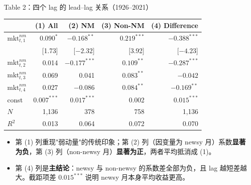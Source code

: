 \documentclass[aspectratio=169,10pt]{beamer}
\newcommand{\tighttable}{\scriptsize\setlength{\tabcolsep}{3pt}\renewcommand{\arraystretch}{1.12}}
\begin{document}
\begin{frame}{Table 2：四个 lag 的 lead--lag 关系（1926--2021）}
	\tighttable
	\begin{tabular}{lrrrr}
		\toprule
		& (1) All & (2) NM & (3) Non-NM & (4) Difference \\
		\midrule
		$\mathrm{mkt}^{nm}_{t,1}$ & $0.090^{*}$ & $-0.168^{**}$ & $0.219^{***}$ & $-0.388^{***}$ \\
		& [1.73] & [$-2.32$] & [3.92] & [$-4.23$] \\
		$\mathrm{mkt}^{nm}_{t,2}$ & 0.014 & $-0.177^{***}$ & $0.109^{**}$ & $-0.287^{***}$ \\
		$\mathrm{mkt}^{nm}_{t,3}$ & 0.069 & 0.041 & $0.083^{**}$ & $-0.042$ \\
		$\mathrm{mkt}^{nm}_{t,4}$ & 0.027 & $-0.086$ & $0.084^{**}$ & $-0.169^{**}$ \\
		const & $0.007^{***}$ & $0.017^{***}$ & 0.002 & $0.015^{***}$ \\
		$N$ & 1{,}136 & 378 & 758 & 1{,}136 \\
		$R^2$ & 0.013 & 0.064 & 0.072 & 0.070 \\
		\bottomrule
	\end{tabular}
	\vspace{4pt}
	\begin{itemize}
		\item 第 (1) 列重现"弱动量"的传统印象；第 (2) 列（因变量为 newsy 月）系数\textbf{显著为负}，第 (3) 列（non-newsy 月）\textbf{显著为正}，两者平均抵消成 (1)。
		\item 第 (4) 列是\textbf{主结论}：newsy 与 non-newsy 的系数差全部为负，且 lag 越短差越大。截距项差 $0.015^{***}$ 说明 newsy 月本身平均收益更高。
	\end{itemize}
\end{frame}
\end{document}

